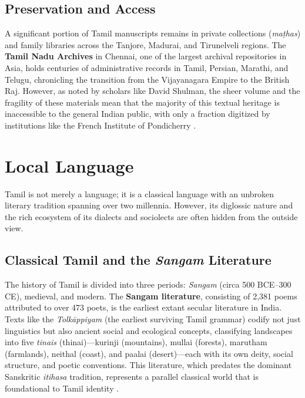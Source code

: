 \documentclass[12pt]{article}
\begin{document}
\subsection{Preservation and Access}
A significant portion of Tamil manuscripts remains in private collections (\textit{maṭhas}) and family libraries across the Tanjore, Madurai, and Tirunelveli regions. The \textbf{Tamil Nadu Archives} in Chennai, one of the largest archival repositories in Asia, holds centuries of administrative records in Tamil, Persian, Marathi, and Telugu, chronicling the transition from the Vijayanagara Empire to the British Raj. However, as noted by scholars like David Shulman, the sheer volume and the fragility of these materials mean that the majority of this textual heritage is inaccessible to the general Indian public, with only a fraction digitized by institutions like the French Institute of Pondicherry \cite{shulman2016}.

\section{Local Language}
Tamil is not merely a language; it is a classical language with an unbroken literary tradition spanning over two millennia. However, its diglossic nature and the rich ecosystem of its dialects and sociolects are often hidden from the outside view.

\subsection{Classical Tamil and the \textit{Sangam} Literature}
The history of Tamil is divided into three periods: \textit{Sangam} (circa 500 BCE–300 CE), medieval, and modern. The \textbf{Sangam literature}, consisting of 2,381 poems attributed to over 473 poets, is the earliest extant secular literature in India. Texts like the \textit{Tolkāppiyam} (the earliest surviving Tamil grammar) codify not just linguistics but also ancient social and ecological concepts, classifying landscapes into five \textit{tinais} (thinai)—kurinji (mountains), mullai (forests), marutham (farmlands), neithal (coast), and paalai (desert)—each with its own deity, social structure, and poetic conventions. This literature, which predates the dominant Sanskritic \textit{itihasa} tradition, represents a parallel classical world that is foundational to Tamil identity \cite{zvelebil1973}.
\end{document}
